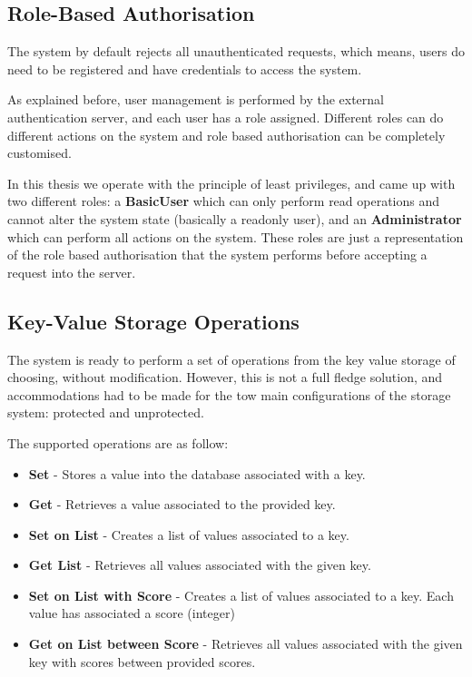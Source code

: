 \subsection{Role-Based Authorisation}
\label{ssec:role-based_authorisation}

The system by default rejects all unauthenticated requests, which means, users do need to be registered and have credentials to access the system.

As explained before, user management is performed by the external authentication server, and each user has a role assigned. Different roles can do different actions on the system and role based authorisation can be completely customised.

In this thesis we operate with the principle of least privileges, and came up with two different roles: a \textbf{BasicUser} which can only perform read operations and cannot alter the system state (basically a readonly user), and an \textbf{Administrator} which can perform all actions on the system. These roles are just a representation of the role based authorisation that the system performs before accepting a request into the server.

\subsection{Key-Value Storage Operations}
\label{ssec:key-value_storage_operations}

The system is ready to perform a set of operations from the key value storage of choosing, without modification. However, this is not a full fledge solution, and accommodations had to be made for the tow main configurations of the storage system: protected and unprotected.

The supported operations are as follow:

\begin{itemize}
  \item \textbf{Set} - Stores a value into the database associated with a key.
  \item \textbf{Get} - Retrieves a value associated to the provided key.
  \item \textbf{Set on List} - Creates a list of values associated to a key.
  \item \textbf{Get List} - Retrieves all values associated with the given key.
  \item \textbf{Set on List with Score} - Creates a list of values associated to a key. Each value has associated a score (integer)
  \item \textbf{Get on List between Score} - Retrieves all values associated with the given key with scores between provided scores. 
\end{itemize}

